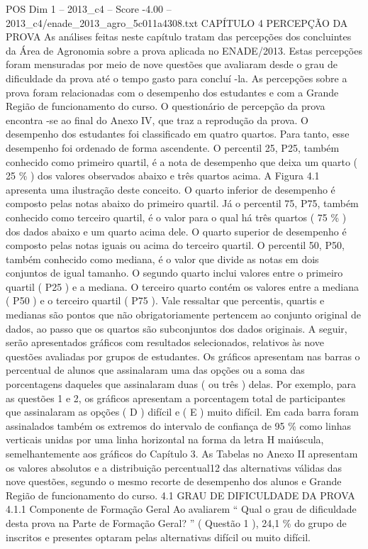 \begin{textsample}{POS Dim 1 – 2013\_c4 – Score -4.00 – 2013\_c4/enade\_2013\_agro\_5c011a4308.txt}  \label{ex:f1_pos_381}
CAPÍTULO 4 PERCEPÇÃO DA PROVA As análises feitas neste capítulo tratam das percepções dos concluintes da Área de Agronomia sobre a prova aplicada no ENADE/2013.
Estas percepções foram mensuradas por meio de nove questões que avaliaram desde o grau de dificuldade da prova até o tempo gasto para concluí -la.
As percepções sobre a prova foram relacionadas com o desempenho dos estudantes e com a Grande Região de funcionamento do curso.
O questionário de percepção da prova encontra -se ao final do Anexo IV, que traz a reprodução da prova.
O desempenho dos estudantes foi classificado em quatro quartos.
Para tanto, esse desempenho foi ordenado de forma ascendente.
O percentil 25, P25, também conhecido como primeiro quartil, é a nota de desempenho que deixa um quarto ( 25 \% ) dos valores observados abaixo e três quartos acima.
A Figura 4.1 apresenta uma ilustração deste conceito.
O quarto inferior de desempenho é composto pelas notas abaixo do primeiro quartil.
Já o percentil 75, P75, também conhecido como terceiro quartil, é o valor para o qual há três quartos ( 75 \% ) dos dados abaixo e um quarto acima dele.
O quarto superior de desempenho é composto pelas notas iguais ou acima do terceiro quartil.
O percentil 50, P50, também conhecido como mediana, é o valor que divide as notas em dois conjuntos de igual tamanho.
O segundo quarto inclui valores entre o primeiro quartil ( P25 ) e a mediana.
O terceiro quarto contém os valores entre a mediana ( P50 ) e o terceiro quartil ( P75 ).
Vale ressaltar que percentis, quartis e medianas são pontos que não obrigatoriamente pertencem ao conjunto original de dados, ao passo que os quartos são subconjuntos dos dados originais.
A seguir, serão apresentados gráficos com resultados selecionados, relativos às nove questões avaliadas por grupos de estudantes.
Os gráficos apresentam nas barras o percentual de alunos que assinalaram uma das opções ou a soma das porcentagens daqueles que assinalaram duas ( ou três ) delas.
Por exemplo, para as questões 1 e 2, os gráficos apresentam a porcentagem total de participantes que assinalaram as opções ( D ) difícil e ( E ) muito difícil.
Em cada barra foram assinalados também os extremos do intervalo de confiança de 95 \% como linhas verticais unidas por uma linha horizontal na forma da letra H maiúscula, semelhantemente aos gráficos do Capítulo 3.
As Tabelas no Anexo II apresentam os valores absolutos e a distribuição percentual12 das alternativas válidas das nove questões, segundo o mesmo recorte de desempenho dos alunos e Grande Região de funcionamento do curso. 4.1 GRAU DE DIFICULDADE DA PROVA 4.1.1 Componente de Formação Geral Ao avaliarem “ Qual o grau de dificuldade desta prova na Parte de Formação Geral? ” ( Questão 1 ), 24,1 \% do grupo de inscritos e presentes optaram pelas alternativas difícil ou muito difícil.

\end{textsample}

